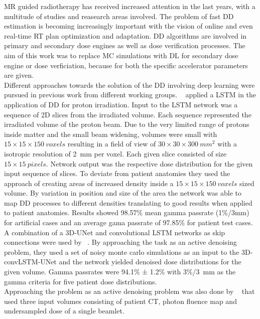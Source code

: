 
MR guided radiotherapy has received increased attention in the last years, with a multitude of studies and reasearch areas involved.
The problem of fast \acs{DD} estimation is becoming increasingly important with the vision of online and even real-time \acs{RT} plan optimization and adaptation.
\acs{DD} algorithms are involved in primary and secondary dose engines as well as dose verification processes. 
The aim of this work was to replace \acs{MC} simulations with \acs{DL} for secondary dose engine or dose verficiation, because for both the specific accelerator parameters are given.\\
Different approaches towards the solution of the \acs{DD} involving deep learning were pursued in previous work from different working groups. 
\citeauthor{neishabouri_long_2021}~\cite{neishabouri_long_2021} applied a \ac{LSTM} in the application of \acs{DD} for proton irradiation.
Input to the \acs{LSTM} network was a sequence of 2D slices from the irradiated volume.
Each sequence represented the irradiated volume of the proton beam.
Due to the very limited range of protons inside matter and the small beam widening, volumes were small with $15 \times 15 \times 150~voxels$ resulting in a field of view of $30 \times 30 \times 300~mm^2$ with a isotropic resolution of 2~mm per voxel.
Each given slice consisted of size $15 \times 15~pixels$.
Network output was the respective dose distribution for the given input sequence of slices.
To deviate from patient anatomies they used the approach of creating areas of increased density inside a $15 \times 15 \times 150~voxels$ sized volume.
By variation in position and size of the area the network was able to map \acs{DD} processes to different densities translating to good results when applied to patient anatomies.
Results showed 98.57\% mean gamma passrate (1\%/3mm) for artificial cases and an average gama passrate of 97.85\% for patient test cases.\\
A combination of a 3D-UNet and convolutional \acs{LSTM} networks as skip connections were used by \citeauthor{de_bruijne_high-particle_2021}~\cite{de_bruijne_high-particle_2021}.
By approaching the task as an active denoising problem, they used a set of noisy monte carlo simulations as an input to the 3D-convLSTM-UNet and the network yielded denoised dose distributions for the given volume.
Gamma passrates were 94.1\% ± 1.2\% with 3\%/3~mm as the gamma criteria for five patient dose distributions.\\
Approaching the problem as an active denoising problem was also done by \citeauthor{neph_deepmcdose_2019}~\cite{neph_deepmcdose_2019} that used three input volumes consisting of patient CT, photon fluence map and undersampled dose of a single beamlet.
